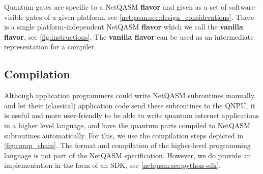 
Quantum gates are specific to a \ac{NetQASM} \textbf{flavor} and given as a set of software-visible gates of a given platform, see \cref{netqasm:sec:design_considerations}.
There is a single platform-independent \ac{NetQASM} \textbf{flavor} which we call the \textbf{vanilla flavor}, see \cref{fig:instructions}.
The \textbf{vanilla flavor} can be used as an intermediate representation for a compiler.


\subsection{Compilation}
Although application programmers could write \ac{NetQASM} subroutines manually, and let their (classical) application code send these subroutines to the \ac{QNPU}, it is useful and more user-friendly to be able to write quantum internet applications in a higher level language, and have the quantum parts compiled to \ac{NetQASM} subroutines automatically.
For this, we use the compilation steps depicted in \cref{fig:comp_chain}.
The format and compilation of the higher-level programming language is not part of the \ac{NetQASM} specification.
However, we do provide an implementation in the form of an SDK, see \cref{netqasm:sec:python-sdk}.

